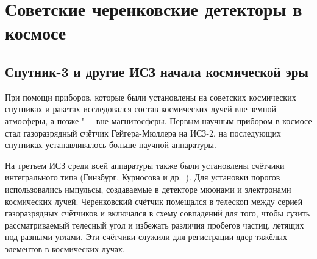 \documentclass[12pt,a4paper]{report} %
\begin{document}
\section{Советские черенковские детекторы в космосе}

\subsection{Спутник-3 и другие ИСЗ начала космической эры}

При помощи приборов, которые были установлены на советских космических спутниках и ракетах исследовался состав космических лучей вне земной атмосферы, а позже "--- вне магнитосферы. Первым научным прибором в космосе стал газоразрядный счётчик Гейгера-Мюллера на ИСЗ-2, на последующих спутниках устанавливалось больше научной аппаратуры. 

На третьем ИСЗ среди всей аппаратуры также были установлены счётчики интегрального типа (Гинзбург, Курносова и др.~\cite{Ginzburg}).
Для установки порогов использовались импульсы, создаваемые в детекторе мюонами и электронами космических лучей. 
Черенковский счётчик помещался в телескоп между серией газоразрядных счётчиков и включался в схему совпадений для того, чтобы сузить рассматриваемый телесный угол и избежать различия пробегов частиц, летящих под разными углами. Эти счётчики служили для регистрации ядер тяжёлых элементов в космических лучах. 
\end{document}

